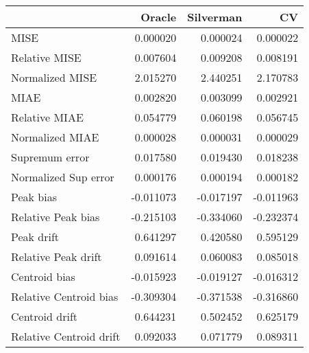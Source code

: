 \begin{tabular}{lrrr}
  \toprule
 & Oracle & Silverman & CV \\ 
  \midrule
MISE & 0.000020 & 0.000024 & 0.000022 \\ 
  Relative MISE & 0.007604 & 0.009208 & 0.008191 \\ 
  Normalized MISE & 2.015270 & 2.440251 & 2.170783 \\ 
  MIAE & 0.002820 & 0.003099 & 0.002921 \\ 
  Relative MIAE & 0.054779 & 0.060198 & 0.056745 \\ 
  Normalized MIAE & 0.000028 & 0.000031 & 0.000029 \\ 
  Supremum error & 0.017580 & 0.019430 & 0.018238 \\ 
  Normalized Sup error & 0.000176 & 0.000194 & 0.000182 \\ 
  Peak bias & -0.011073 & -0.017197 & -0.011963 \\ 
  Relative Peak bias & -0.215103 & -0.334060 & -0.232374 \\ 
  Peak drift & 0.641297 & 0.420580 & 0.595129 \\ 
  Relative Peak drift & 0.091614 & 0.060083 & 0.085018 \\ 
  Centroid bias & -0.015923 & -0.019127 & -0.016312 \\ 
  Relative Centroid bias & -0.309304 & -0.371538 & -0.316860 \\ 
  Centroid drift & 0.644231 & 0.502452 & 0.625179 \\ 
  Relative Centroid drift & 0.092033 & 0.071779 & 0.089311 \\ 
   \bottomrule
\end{tabular}
